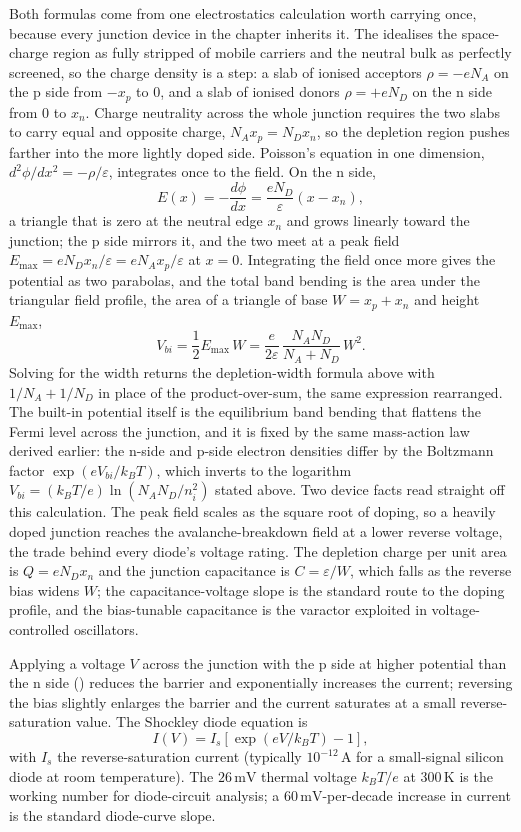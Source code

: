 Both formulas come from one electrostatics calculation worth carrying
once, because every junction device in the chapter inherits it. The
 idealises the space-charge region as
fully stripped of mobile carriers and the neutral bulk as perfectly
screened, so the charge density is a step: a slab of ionised acceptors
$\rho = -eN_A$ on the p side from $-x_p$ to $0$, and a slab of ionised
donors $\rho = +eN_D$ on the n side from $0$ to $x_n$. Charge neutrality
across the whole junction requires the two slabs to carry equal and
opposite charge, $N_A x_p = N_D x_n$, so the depletion region pushes
farther into the more lightly doped side. Poisson's equation in one
dimension, $d^{2}\phi/dx^{2} = -\rho/\varepsilon$, integrates once to the
field. On the n side,
\[
E(x) = -\frac{d\phi}{dx}
     = \frac{eN_D}{\varepsilon}(x - x_n),
\]
a triangle that is zero at the neutral edge $x_n$ and grows linearly
toward the junction; the p side mirrors it, and the two meet at a peak
field $E_{\max} = eN_D x_n/\varepsilon = eN_A x_p/\varepsilon$ at $x = 0$.
Integrating the field once more gives the potential as two parabolas, and
the total band bending is the area under the triangular field profile, the
area of a triangle of base $W = x_p + x_n$ and height $E_{\max}$,
\[
V_{bi} = \frac{1}{2}E_{\max}\,W
       = \frac{e}{2\varepsilon}\,
         \frac{N_A N_D}{N_A + N_D}\,W^{2}.
\]
Solving for the width returns the depletion-width formula above with
$1/N_A + 1/N_D$ in place of the product-over-sum, the same expression
rearranged. The built-in potential itself is the equilibrium band
bending that flattens the Fermi level across the junction, and it is fixed
by the same mass-action law derived earlier: the n-side and p-side
electron densities differ by the Boltzmann factor $\exp(eV_{bi}/k_B T)$,
which inverts to the logarithm $V_{bi} = (k_B T/e)\ln(N_A N_D/n_i^{2})$
stated above. Two device facts read straight off this calculation. The
peak field scales as the square root of doping, so a heavily doped
junction reaches the avalanche-breakdown field at a lower reverse voltage,
the trade behind every diode's voltage rating. The depletion charge per
unit area is $Q = eN_D x_n$ and the junction capacitance is $C = \varepsilon
/W$, which falls as the reverse bias widens $W$; the capacitance-voltage
slope is the standard route to the doping profile, and the bias-tunable
capacitance is the varactor exploited in voltage-controlled oscillators.

Applying a voltage $V$ across the junction with the p side at higher
potential than the n side () reduces the
barrier and exponentially increases the current; reversing the bias
slightly enlarges the barrier and the current saturates at a small
reverse-saturation value. The Shockley diode equation is
\[
I(V) = I_{s}\left[\exp(eV/k_{B}T) - 1\right],
\]
with $I_{s}$ the reverse-saturation current (typically $10^{-12}\,\si{
\ampere}$ for a small-signal silicon diode at room temperature). The
$26\,\si{\milli\volt}$ thermal voltage $k_{B}T/e$ at $300\,\si{\kelvin}$
is the working number for diode-circuit analysis; a $60\,\si{\milli
\volt}$-per-decade increase in current is the standard diode-curve
slope.

